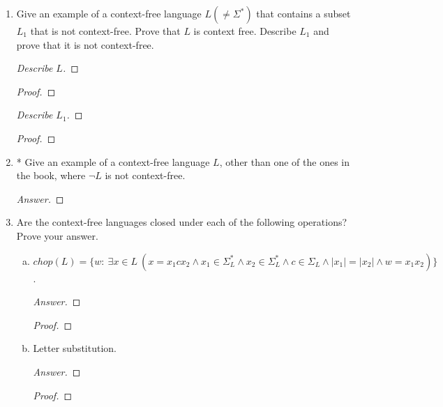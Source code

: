 \documentclass[10pt]{article}
\newcommand{\card}[1]{\left| #1 \right|}
\begin{document}
\begin{enumerate}[1)]
\begin{enumerate}[a)]
\item
\{$x\#y$ : $x, y \in \{0, 1\}^*$ and when $x$ and $y$ are viewed as binary numbers, $y = x^2$\}.  For example, the string 100\#10000 $\in L$.
\begin{proof}[Answer]
Not context-free.
\end{proof}
\begin{proof}[Proof]
\end{proof}
\end{enumerate}


\item
Give an example of a context-free language $L(\neq \Sigma ^*)$ that contains a subset $L_1$ that is not context-free.  Prove that $L$ is context free.  Describe $L_1$ and prove that it is not context-free.
\begin{proof}[Describe $L$]
\end{proof}
\begin{proof}[Proof]
\end{proof}
\begin{proof}[Describe $L_1$]
\end{proof}
\begin{proof}[Proof]
\end{proof}


\item
*  Give an example of a context-free language  $L$, other than one of the ones in the book, where  $\lnot L$ is not context-free.
\begin{proof}[Answer]
\end{proof}



\item
Are the context-free languages closed under each of the following operations?  Prove your answer.
\begin{enumerate}[a)]
\item
$chop(L) = \{w:\ \exists x \in L\ (x = x_1cx_2 \land x_1 \in \Sigma _L^* \land x_2 \in \Sigma _L^* \land c \in \Sigma _L \land \card{x_1} = \card{x_2} \land w = x_1x_2)\}$.
\begin{proof}[Answer]
\end{proof}
\begin{proof}[Proof]
\end{proof}

\item
Letter substitution.
\begin{proof}[Answer]
\end{proof}
\begin{proof}[Proof]
\end{proof}
\end{enumerate}


\end{enumerate}
\end{document}
